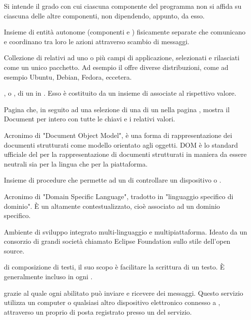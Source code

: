 {Si intende il grado con cui ciascuna componente del programma non si affida su ciascuna delle altre componenti, non dipendendo, appunto, da esso.}

{Insieme di entità autonome (componenti  e ) fisicamente separate che comunicano e coordinano tra loro le azioni attraverso scambio di messaggi.}

{Collezione di  relativi ad uno o più campi di applicazione, selezionati e rilasciati come un unico pacchetto. Ad esempio il   offre diverse distribuzioni, come ad esempio Ubuntu, Debian, Fedora, eccetera.}

{, o , di un  in . Esso è costituito da un insieme di  associate al rispettivo valore.}

{Pagina che, in seguito ad una selezione di una  di un  nella pagina , mostra il Document per intero con tutte le chiavi e i relativi valori.}

{Acronimo di "Document Object Model", è una forma di rappresentazione dei documenti strutturati come modello orientato agli oggetti.
DOM è lo standard ufficiale del  per la rappresentazione di documenti strutturati in maniera da essere neutrali sia per la lingua che per la piattaforma.}

{Insieme di procedure che permette ad un  di controllare un dispositivo  o .}

{Acronimo di "Domain Specific Language", tradotto in "linguaggio specifico di dominio". \`{E} un  altamente contestualizzato, cioè associato ad un dominio specifico.} 



{Ambiente di sviluppo integrato multi-linguaggio e multipiattaforma. Ideato da un consorzio di grandi società chiamato Eclipse Foundation sullo stile dell'open source.}

{ di composizione di testi, il suo scopo è facilitare la scrittura di un testo. \`{E} generalmente incluso in ogni .}

{  grazie al quale ogni  abilitato può inviare e ricevere dei messaggi. Questo servizio utilizza un computer o qualsiasi altro dispositivo elettronico connesso a , attraverso un proprio  di posta registrato presso un  del servizio.}

